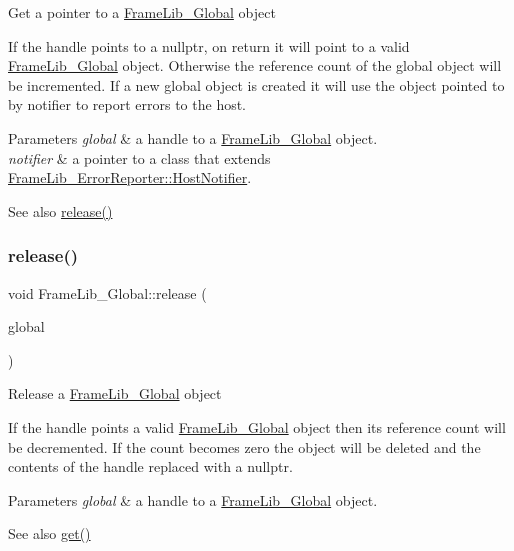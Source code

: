 Get a pointer to a \hyperlink{class_frame_lib___global}{Frame\+Lib\+\_\+\+Global} object

If the handle points to a nullptr, on return it will point to a valid \hyperlink{class_frame_lib___global}{Frame\+Lib\+\_\+\+Global} object. Otherwise the reference count of the global object will be incremented. If a new global object is created it will use the object pointed to by notifier to report errors to the host.


\begin{DoxyParams}{Parameters}
{\em global} & a handle to a \hyperlink{class_frame_lib___global}{Frame\+Lib\+\_\+\+Global} object. \\
\hline
{\em notifier} & a pointer to a class that extends \hyperlink{struct_frame_lib___error_reporter_1_1_host_notifier}{Frame\+Lib\+\_\+\+Error\+Reporter\+::\+Host\+Notifier}.\\
\hline
\end{DoxyParams}
\begin{DoxySeeAlso}{See also}
\hyperlink{class_frame_lib___global_a079e2b866b66d477ae551e0b0e12ea11}{release()} 
\end{DoxySeeAlso}
\mbox{\label{class_frame_lib___global_a079e2b866b66d477ae551e0b0e12ea11}} 
\subsubsection{\texorpdfstring{release()}{release()}}
{\footnotesize\ttfamily void Frame\+Lib\+\_\+\+Global\+::release (\begin{DoxyParamCaption}\item[{\hyperlink{class_frame_lib___global}{Frame\+Lib\+\_\+\+Global} $\ast$$\ast$}]{global }\end{DoxyParamCaption})\hspace{0.3cm}{\ttfamily [static]}}

Release a \hyperlink{class_frame_lib___global}{Frame\+Lib\+\_\+\+Global} object

If the handle points a valid \hyperlink{class_frame_lib___global}{Frame\+Lib\+\_\+\+Global} object then its reference count will be decremented. If the count becomes zero the object will be deleted and the contents of the handle replaced with a nullptr.


\begin{DoxyParams}{Parameters}
{\em global} & a handle to a \hyperlink{class_frame_lib___global}{Frame\+Lib\+\_\+\+Global} object.\\
\hline
\end{DoxyParams}
\begin{DoxySeeAlso}{See also}
\hyperlink{class_frame_lib___global_a2d24a293da4c71e089e4738cfbbf6aec}{get()} 
\end{DoxySeeAlso}


